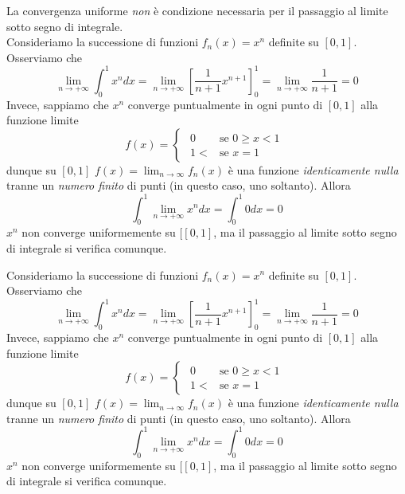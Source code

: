 \begin{example}
	La convergenza uniforme \textit{non} è condizione necessaria per il passaggio al limite sotto segno di integrale.\\
	Consideriamo la successione di funzioni $f_n\left(x\right)=x^n$ definite su $\left[0,1\right]$. Osserviamo che
	\begin{equation*}
		\lim_{n\to+\infty}\int_{0}^{1}x^ndx=\lim_{n\to+\infty}\left[\frac{1}{n+1}x^{n+1}\right]_{0}^{1}=\lim_{n\to+\infty}\frac{1}{n+1}=0
	\end{equation*}
Invece, sappiamo che $x^n$ converge puntualmente in ogni punto di $[0,1]$ alla funzione limite 
\begin{equation*}
	f\left(x\right)=
	\begin{cases}
		\begin{array}{ll}
			0&\text{se }0\geq x < 1\\
			1<&\text{se }x=1
		\end{array}
	\end{cases}
\end{equation*}
dunque su $[0,1]$ $f\left(x\right)=\lim_{n\to\infty}f_n\left(x\right)$ è una funzione \textit{identicamente nulla} tranne un \textit{numero finito} di punti (in questo caso, uno soltanto). Allora
\begin{equation*}
	\int_{0}^{1}\lim_{n\to+\infty}x^ndx=\int_{0}^{1}0dx=0
\end{equation*}
 $x^n$ non converge uniformemente su $[\left[0,1\right]$, ma il passaggio al limite sotto segno di integrale si verifica comunque.
\end{example}
\begin{example}
	Consideriamo la successione di funzioni $f_n\left(x\right)=x^n$ definite su $\left[0,1\right]$. Osserviamo che
	\begin{equation*}
		\lim_{n\to+\infty}\int_{0}^{1}x^ndx=\lim_{n\to+\infty}\left[\frac{1}{n+1}x^{n+1}\right]_{0}^{1}=\lim_{n\to+\infty}\frac{1}{n+1}=0
	\end{equation*}
	Invece, sappiamo che $x^n$ converge puntualmente in ogni punto di $[0,1]$ alla funzione limite 
	\begin{equation*}
		f\left(x\right)=
		\begin{cases}
			\begin{array}{ll}
				0&\text{se }0\geq x < 1\\
				1<&\text{se }x=1
			\end{array}
		\end{cases}
	\end{equation*}
	dunque su $[0,1]$ $f\left(x\right)=\lim_{n\to\infty}f_n\left(x\right)$ è una funzione \textit{identicamente nulla} tranne un \textit{numero finito} di punti (in questo caso, uno soltanto). Allora
	\begin{equation*}
		\int_{0}^{1}\lim_{n\to+\infty}x^ndx=\int_{0}^{1}0dx=0
	\end{equation*}
	$x^n$ non converge uniformemente su $[\left[0,1\right]$, ma il passaggio al limite sotto segno di integrale si verifica comunque.
\end{example}
